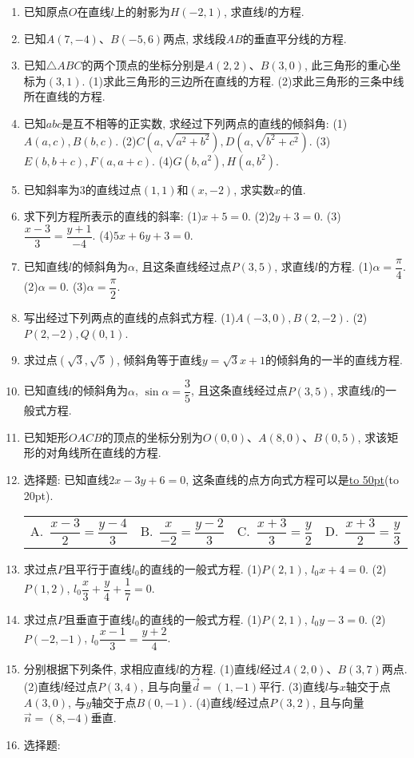 \documentclass[10pt,a4paper]{article}
\newcommand{\blank}[1]{\underline{\hbox to #1pt{}}}
\newcommand{\bracket}[1]{(\hbox to #1pt{})}
\newcommand{\fourch}[4]{\par\begin{tabular}{p{.23\textwidth}p{.23\textwidth}p{.23\textwidth}p{.23\textwidth}}
A.~#1 &B.~#2& C.~#3& D.~#4
\end{tabular}}
\begin{document}
\begin{enumerate}[1.]
\item 已知原点$O$在直线$l$上的射影为$H(-2,1)$, 求直线$l$的方程.
\item 已知$A(7,-4)$、$B(-5,6)$两点, 求线段$AB$的垂直平分线的方程.
\item 已知$\triangle ABC$的两个顶点的坐标分别是$A(2,2)$、$B(3,0)$, 此三角形的重心坐标为$(3,1)$.
(1)求此三角形的三边所在直线的方程.
(2)求此三角形的三条中线所在直线的方程.
\item 已知$abc$是互不相等的正实数, 求经过下列两点的直线的倾斜角:
(1)$A(a,c),B(b,c)$.					(2)$C(a,\sqrt {a^2+b^2}),D(a,\sqrt {b^2+c^2})$.
(3)$E(b,b+c),F(a,a+c)$.				(4)$G(b,a^2),H(a,b^2)$.
\item 已知斜率为$3$的直线过点$(1,1)$和$(x,-2)$, 求实数$x$的值.
\item 求下列方程所表示的直线的斜率:
(1)$x+5=0$.							(2)$2y+3=0$.
(3)$\dfrac{x-3}3=\dfrac{y+1}{-4}$.						(4)$5x+6y+3=0$.
\item 已知直线$l$的倾斜角为$\alpha$, 且这条直线经过点$P(3,5)$, 求直线$l$的方程.
(1)$\alpha =\dfrac{\pi }4$.								(2)$\alpha =0$.
(3)$\alpha =\dfrac{\pi }2$.
\item 写出经过下列两点的直线的点斜式方程.
(1)$A(-3,0),B(2,-2)$.					(2)$P(2,-2),Q(0,1)$.
\item 求过点$(\sqrt 3,\sqrt 5)$, 倾斜角等于直线$y=\sqrt 3x+1$的倾斜角的一半的直线方程.
\item 已知直线$l$的倾斜角为$\alpha$, $\sin \alpha =\dfrac 35$, 且这条直线经过点$P(3,5)$, 求直线$l$的一般式方程.
\item 已知矩形$OACB$的顶点的坐标分别为$O(0,0)$、$A(8,0)$、$B(0,5)$, 求该矩形的对角线所在直线的方程.
\item 选择题:
已知直线$2x-3y+6=0$, 这条直线的点方向式方程可以是\blank{50}\bracket{20}.
\fourch{$\dfrac{x-3}2=\dfrac{y-4}3$}{$\dfrac x{-2}=\dfrac{y-2}3$}{$\dfrac{x+3}3=\dfrac y2$}{$\dfrac{x+3}2=\dfrac y3$}
\item 求过点$P$且平行于直线$l_0$的直线的一般式方程.
(1)$P(2,1)$, $l_0x+4=0$.				(2)$P(1,2)$, $l_0\dfrac x3+\dfrac y4+\dfrac 17=0$.
\item 求过点$P$且垂直于直线$l_0$的直线的一般式方程.
(1)$P(2,1)$, $l_0y-3=0$.				(2)$P(-2,-1)$, $l_0\dfrac{x-1}3=\dfrac{y+2}4$.
\item 分别根据下列条件, 求相应直线$l$的方程.
(1)直线$l$经过$A(2,0)$、$B(3,7)$两点.
(2)直线$l$经过点$P(3,4)$, 且与向量$\overrightarrow d=(1,-1)$平行.
(3)直线$l$与$x$轴交于点$A(3,0)$, 与$y$轴交于点$B(0,-1)$.
(4)直线$l$经过点$P(3,2)$, 且与向量$\overrightarrow n=(8,-4)$垂直.
\item 选择题:

\end{enumerate}
\end{document}
